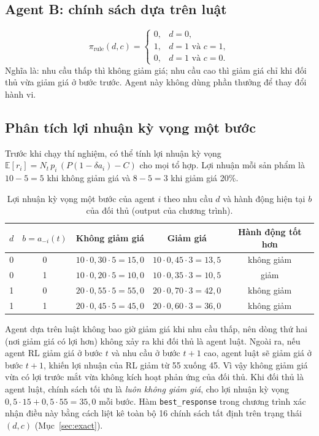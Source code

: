 \documentclass[12pt,a4paper]{report}
\begin{document}
\subsection{Agent B: chính sách dựa trên luật}
\begin{equation}
\pi_{\text{rule}}(d,c)=\begin{cases}0,& d=0,\\ 1,& d=1\text{ và }c=1,\\ 0,& d=1\text{ và }c=0.\end{cases}
\end{equation}
Nghĩa là: nhu cầu thấp thì không giảm giá; nhu cầu cao thì giảm giá chỉ khi đối thủ
vừa giảm giá ở bước trước. Agent này không dùng phần thưởng để thay đổi hành vi.

\subsection{Phân tích lợi nhuận kỳ vọng một bước}
Trước khi chạy thí nghiệm, có thể tính lợi nhuận kỳ vọng
$\mathbb E[r_i]=N_t\,p_i\,(P(1-\delta a_i)-C)$ cho mọi tổ hợp. Lợi nhuận mỗi sản
phẩm là $10-5=5$ khi không giảm giá và $8-5=3$ khi giảm giá 20\%.

\begin{table}[H]
\centering
\small
\caption{Lợi nhuận kỳ vọng một bước của agent $i$ theo nhu cầu $d$ và hành động hiện tại $b$ của đối thủ (output của chương trình).}
\label{tab:onestep}
\begin{tabular}{ccccc}
\toprule
$d$ & $b=a_{-i}(t)$ & Không giảm giá & Giảm giá & Hành động tốt hơn \\
\midrule
0 & 0 & $10\cdot0{,}30\cdot5=15{,}0$ & $10\cdot0{,}45\cdot3=13{,}5$ & không giảm \\
0 & 1 & $10\cdot0{,}20\cdot5=10{,}0$ & $10\cdot0{,}35\cdot3=10{,}5$ & giảm \\
1 & 0 & $20\cdot0{,}55\cdot5=55{,}0$ & $20\cdot0{,}70\cdot3=42{,}0$ & không giảm \\
1 & 1 & $20\cdot0{,}45\cdot5=45{,}0$ & $20\cdot0{,}60\cdot3=36{,}0$ & không giảm \\
\bottomrule
\end{tabular}
\end{table}

Agent dựa trên luật không bao giờ giảm giá khi nhu cầu thấp, nên dòng thứ hai
(nơi giảm giá có lợi hơn) không xảy ra khi đối thủ là agent luật. Ngoài ra, nếu
agent RL giảm giá ở bước $t$ và nhu cầu ở bước $t+1$ cao, agent luật sẽ giảm giá ở
bước $t+1$, khiến lợi nhuận của RL giảm từ 55 xuống 45. Vì vậy không giảm giá vừa có
lợi trước mắt vừa không kích hoạt phản ứng của đối thủ. Khi đối thủ là agent luật,
chính sách tối ưu là \emph{luôn không giảm giá}, cho lợi nhuận kỳ vọng
$0{,}5\cdot15+0{,}5\cdot55=35{,}0$ mỗi bước. Hàm \texttt{best\_response} trong
chương trình xác nhận điều này bằng cách liệt kê toàn bộ 16 chính sách tất định
trên trạng thái $(d,c)$ (Mục~\ref{sec:exact}).
\end{document}
